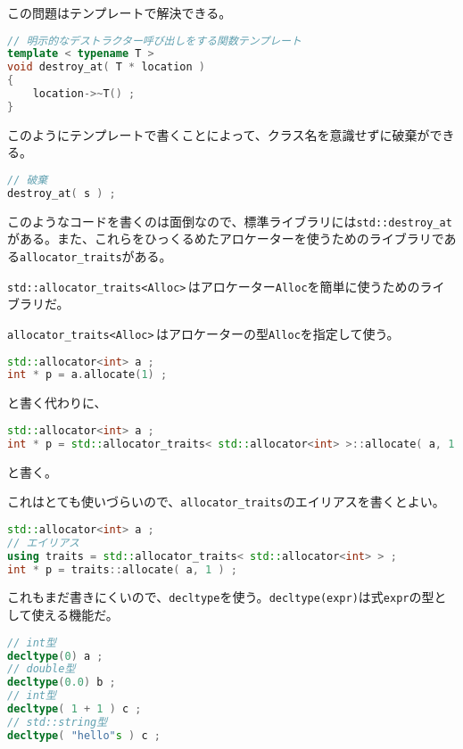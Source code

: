 \ifTombow\pagebreak\fi
この問題はテンプレートで解決できる。

\begin{lstlisting}[language={C++}]
// 明示的なデストラクター呼び出しをする関数テンプレート
template < typename T >
void destroy_at( T * location )
{
    location->~T() ;
}
\end{lstlisting}

このようにテンプレートで書くことによって、クラス名を意識せずに破棄ができる。

\begin{lstlisting}[language={C++}]
// 破棄
destroy_at( s ) ;
\end{lstlisting}

このようなコードを書くのは面倒なので、標準ライブラリには\texttt{std::destroy\_at}がある。また、これらをひっくるめたアロケーターを使うためのライブラリである\texttt{allocator\_traits}がある。


\texttt{std::allocator\_traits<Alloc>}\,はアロケーター\texttt{Alloc}を簡単に使うためのライブラリだ。

\texttt{allocator\_traits<Alloc>}\,はアロケーターの型\texttt{Alloc}を指定して使う。

\begin{lstlisting}[language={C++}]
std::allocator<int> a ;
int * p = a.allocate(1) ;
\end{lstlisting}
と書く代わりに、
\begin{lstlisting}[language={C++}]
std::allocator<int> a ;
int * p = std::allocator_traits< std::allocator<int> >::allocate( a, 1 ) ;
\end{lstlisting}
と書く。

これはとても使いづらいので、\texttt{allocator\_traits}のエイリアスを書くとよい。

\begin{lstlisting}[language={C++}]
std::allocator<int> a ;
// エイリアス
using traits = std::allocator_traits< std::allocator<int> > ;
int * p = traits::allocate( a, 1 ) ;
\end{lstlisting}

これもまだ書きにくいので、\texttt{decltype}を使う。\texttt{decltype(expr)}は式\texttt{expr}の型として使える機能だ。

\ifTombow\pagebreak\fi
\begin{lstlisting}[language={C++}]
// int型
decltype(0) a ;
// double型
decltype(0.0) b ;
// int型
decltype( 1 + 1 ) c ;
// std::string型
decltype( "hello"s ) c ;
\end{lstlisting}

